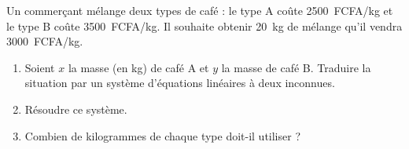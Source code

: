 \documentclass[11pt]{article}
\begin{document}
\begin{exercice}
Un commerçant mélange deux types de café : le type A coûte \SI{2500}{FCFA/kg} et le type B coûte \SI{3500}{FCFA/kg}. Il souhaite obtenir \SI{20}{kg} de mélange qu'il vendra \SI{3000}{FCFA/kg}.
\begin{enumerate}
    \item Soient $x$ la masse (en kg) de café A et $y$ la masse de café B. Traduire la situation par un système d'équations linéaires à deux inconnues.
    \item Résoudre ce système.
    \item Combien de kilogrammes de chaque type doit-il utiliser ?
\end{enumerate}
\end{exercice}
\end{document}
